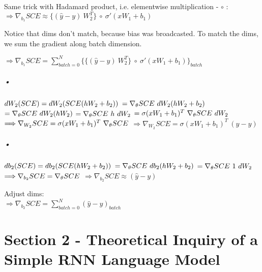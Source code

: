 \documentclass{article}
\begin{document}
Same trick with Hadamard product, i.e. elementwise multiplication - $\circ$ :\\
$\Longrightarrow \nabla_{b_1} SCE \approx \{ (\hat{y}-y) \ W_2^T \} \ \circ \ \sigma' (xW_1+b_1)$

Notice that dims don't match, because bias was broadcasted. To match the dims, we sum the gradient along batch dimension.

$\Longrightarrow \nabla_{b_1} SCE = \sum_{batch=0}^N \{ \{ (\hat{y}-y) \ W_2^T \} \ \circ \ \sigma' (xW_1+b_1)\} _{batch}$

\subparagraph{•}
$dW_2(SCE)=dW_2(SCE(hW_2+b_2)) \\$
$= \nabla_\theta SCE \ dW_2(hW_2+b_2) \\$
$= \nabla_\theta SCE \ dW_2(hW_2) \\$
$= \nabla_\theta SCE \ h \ dW_2 \\$
$= \sigma (xW_1+b_1)^T \ \nabla_\theta SCE \ dW_2 \\$
$\Longrightarrow \nabla_{W_2} SCE = \sigma (xW_1+b_1)^T \ \nabla_\theta SCE \\$
$\Longrightarrow \nabla_{W_2} SCE = \sigma (xW_1+b_1)^T \ (\hat{y}-y)$

\subparagraph{•}
$db_2(SCE)=db_2(SCE(hW_2+b_2)) \\$
$= \nabla_\theta SCE \ db_2(hW_2+b_2) \\$
$= \nabla_\theta SCE \ 1 \ dW_2 \\$
$\Longrightarrow \nabla_{b_2} SCE = \nabla_\theta SCE \\$
$\Longrightarrow \nabla_{b_2} SCE \approx (\hat{y}-y) $

Adjust dims:\\
$\Longrightarrow \nabla_{b_2} SCE = \sum_{batch=0}^N (\hat{y}-y)_{batch} $

\section*{Section 2 - Theoretical Inquiry of a Simple RNN Language Model}
\end{document}
